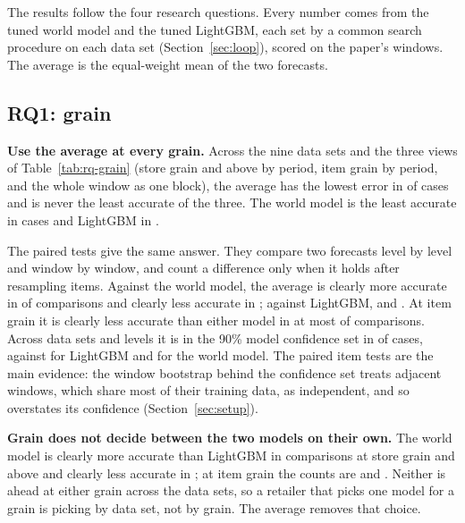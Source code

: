 
The results follow the four research questions. Every number comes from the
tuned world model and the tuned LightGBM, each set by a common search procedure on each
data set (Section~\ref{sec:loop}), scored on the paper's windows. The average is
the equal-weight mean of the two forecasts.

\subsection{RQ1: grain}
\label{sec:rq-grain}

\textbf{Use the average at every grain.} Across the nine data sets and the
three views of Table~\ref{tab:rq-grain} (store grain and above by period, item
grain by period, and the whole window as one block), the average has the lowest
error in \rqAvgBestCells{} of \rqCells{} cases and is never the least accurate of the three. The world
model is the least accurate in \rqWmWorstCells{} cases and LightGBM in \rqLgbWorstCells{}.

The paired tests give the same answer. They compare two forecasts level by level
and window by window, and count a difference only when it holds after
resampling items. Against the world model, the average is clearly more accurate
in \rqPAvgWmBetter{} of \rqPAvgWmN{} comparisons and clearly less accurate in \rqPAvgWmWorse{}; against LightGBM, \rqPAvgLgbBetter{}
and \rqPAvgLgbWorse{}. At item grain it is clearly less accurate than either model in at most \rqAvgItemWorseMax{}
of \rqPAvgWmItemn{} comparisons. Across data sets and levels it is in the 90\% model
confidence set in \rqMcsAverage{} of \rqMcsCells{} cases, against
\rqMcsLightgbm{} for LightGBM and \rqMcsWorldModel{} for the world model. The paired
item tests are the main evidence: the window bootstrap behind the confidence set
treats adjacent windows, which share most of their training data, as
independent, and so overstates its confidence (Section~\ref{sec:setup}).

\textbf{Grain does not decide between the two models on their own.} The world
model is clearly more accurate than LightGBM in \rqPWmLgbCoarsebetter{} comparisons at store grain
and above and clearly less accurate in \rqPWmLgbCoarseworse{}; at item grain the counts are \rqPWmLgbItembetter{} and
\rqPWmLgbItemworse{}. Neither is ahead at either grain across the data sets, so a retailer that
picks one model for a grain is picking by data set, not by grain. The average
removes that choice.

